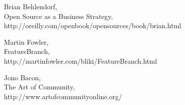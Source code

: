 \documentclass[11pt]{scrartcl}
\begin{document}
\begin{thebibliography}{9}
    Brian Behlendorf,\\
    Open Source as a Business Strategy,\\
    http://oreilly.com/openbook/opensources/book/brian.html
    
    Martin Fowler,\\
    FeatureBranch,\\
    http://martinfowler.com/bliki/FeatureBranch.html
    
    Jono Bacon,\\
    The Art of Community,\\
    http://www.artofcommunityonline.org/
\end{thebibliography}
\end{document}
